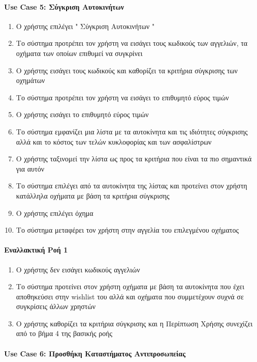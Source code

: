\documentclass{../ol-softwaremanual}
\begin{document}
	\paragraph{\en Use Case 5: \gr Σύγκριση Αυτοκινήτων}
	\begin{enumerate}
		\item Ο χρήστης επιλέγει \en " \gr Σύγκριση Αυτοκινήτων \en " \gr 
		\item Το σύστημα προτρέπει τον χρήστη να εισάγει τους κωδικούς των αγγελιών, τα οχήματα των οποίων επιθυμεί να συγκρίνει
		\item Ο χρήστης εισάγει τους κωδικούς και καθορίζει τα κριτήρια σύγκρισης των οχημάτων
		\item Το σύστημα προτρέπει τον χρήστη να εισάγει το επιθυμητό εύρος τιμών
		\item Ο χρήστης εισάγει το επιθυμητό εύρος τιμών
		\item Το σύστημα εμφανίζει μια λίστα με τα αυτοκίνητα και τις ιδιότητες σύγκρισης αλλά και το κόστος των τελών κυκλοφορίας και των ασφαλίστρων
		\item Ο χρήστης ταξινομεί την λίστα ως προς τα κριτήρια που είναι τα πιο σημαντικά για αυτόν
		\item Το σύστημα επιλέγει από τα αυτοκίνητα της λίστας και προτείνει στον χρήστη κατάλληλα οχήματα με βάση τα κριτήρια σύγκρισης
		\item Ο χρήστης επιλέγει όχημα 
		\item Το σύστημα μεταφέρει τον χρήστη στην αγγελία του επιλεγμένου οχήματος
	\end{enumerate}
	
	\paragraph{Εναλλακτική Ροή 1}
	
	\begin{enumerate}
		\item Ο χρήστης δεν εισάγει κωδικούς αγγελιών
		\item Το σύστημα προτείνει στον χρήστη οχήματα με βάση τα αυτοκίνητα που έχει αποθηκεύσει στην \en wishlist \gr του αλλά και οχήματα που συμμετέχουν συχνά σε συγκρίσεις άλλων χρηστών
		\item Ο χρήστης καθορίζει τα κριτήρια σύγκρισης και η Περίπτωση Χρήσης συνεχίζει από το βήμα 4 της βασικής ροής
	\end{enumerate}

	\paragraph{\en Use Case 6: \gr Προσθήκη Καταστήματος Αντιπροσωπείας}
	
\end{document}
